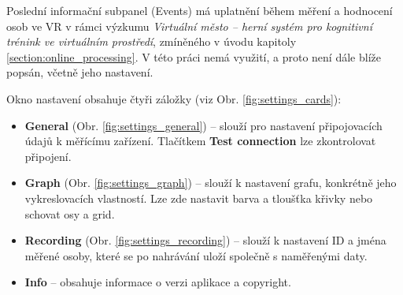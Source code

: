 Poslední informační subpanel (Events) má uplatnění během měření a hodnocení osob
ve VR v rámci výzkumu \textit{Virtuální město – herní systém pro kognitivní
trénink ve virtuálním prostředí}, zmíněného v úvodu kapitoly
\ref{section:online_processing}. V této práci nemá využití, a proto není dále
blíže popsán, včetně jeho nastavení.

Okno nastavení obsahuje čtyři záložky (viz Obr. \ref{fig:settings_cards}):
\begin{itemize}
    \item \textbf{General} (Obr. \ref{fig:settings_general}) -- slouží pro
          nastavení připojovacích údajů k měřícímu zařízení. Tlačítkem \textbf{Test
              connection} lze zkontrolovat připojení.
    \item \textbf{Graph} (Obr. \ref{fig:settings_graph}) -- slouží k nastavení
          grafu, konkrétně jeho vykreslovacích vlastností. Lze zde nastavit barva a
          tloušťka křivky nebo schovat osy a grid.
    \item \textbf{Recording} (Obr. \ref{fig:settings_recording}) -- slouží k
          nastavení ID a jména měřené osoby, které se po nahrávání uloží společně s
          naměřenými daty.
    \item \textbf{Info} -- obsahuje informace o verzi aplikace a copyright.
\end{itemize}

